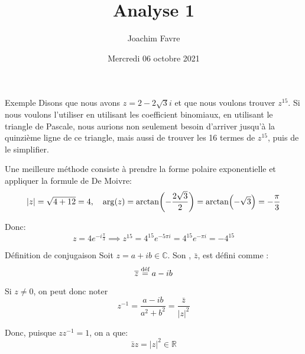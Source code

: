 \documentclass[a4paper]{article}
\title{Analyse 1}
\author{Joachim Favre}
\date{Mercredi 06 octobre 2021}
\begin{document}
\maketitle


\begin{parag}{Exemple}
    Disons que nous avons $z = 2 - 2\sqrt{3}i$ et que nous voulons trouver $z^{15}$. Si nous voulons l'utiliser en utilisant les coefficient binomiaux, en utilisant le triangle de Pascale, nous aurions non seulement besoin d'arriver jusqu'à la quinzième ligne de ce triangle, mais aussi de trouver les 16 termes de $z^{15}$, puis de le simplifier.

    Une meilleure méthode consiste à prendre la forme polaire exponentielle et appliquer la formule de De Moivre:
    \[\left|z\right| = \sqrt{4 + 12} = 4, \mathspace \arg\left(z\right) = \arctan\left(-\frac{2\sqrt{3}}{2}\right) = \arctan\left(-\sqrt{3}\right) = -\frac{\pi}{3}\]

    Donc:
    \[z = 4e^{-i \frac{\pi}{3}} \implies z^{15} = 4^{15} e^{-5 \pi i} = 4^{15} e^{-\pi i} = -4^{15}\]
\end{parag}

\begin{parag}{Définition de conjugaison}
    Soit $z = a + ib \in \mathbb{C}$. Son , $\bar{z}$, est défini comme :
    \[\bar{z} \over{=}{\text{déf}} a - ib\]

    Si $z \neq 0$, on peut donc noter
    \[z^{-1} = \frac{a - ib}{a^2 + b^2} = \frac{\bar{z}}{\left|z\right|^2}\]

    Donc, puisque $zz^{-1} = 1$, on a que:
    \[\bar{z} z = \left|z\right|^2 \in \mathbb{R}\]
\end{parag}
\end{document}
